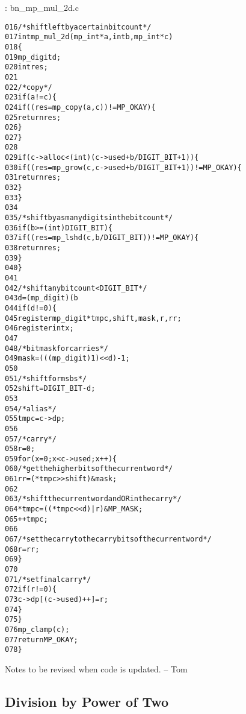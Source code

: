 \documentclass[b5paper]{book}
\begin{document}
\vspace{+3mm}\begin{small}
\hspace{-5.1mm}{\bf File}: bn\_mp\_mul\_2d.c
\vspace{-3mm}
\begin{alltt}
016   /* shift left by a certain bit count */
017   int mp_mul_2d (mp_int * a, int b, mp_int * c)
018   \{
019     mp_digit d;
020     int      res;
021   
022     /* copy */
023     if (a != c) \{
024        if ((res = mp_copy (a, c)) != MP_OKAY) \{
025          return res;
026        \}
027     \}
028   
029     if (c->alloc < (int)(c->used + b/DIGIT_BIT + 1)) \{
030        if ((res = mp_grow (c, c->used + b / DIGIT_BIT + 1)) != MP_OKAY) \{
031          return res;
032        \}
033     \}
034   
035     /* shift by as many digits in the bit count */
036     if (b >= (int)DIGIT_BIT) \{
037       if ((res = mp_lshd (c, b / DIGIT_BIT)) != MP_OKAY) \{
038         return res;
039       \}
040     \}
041   
042     /* shift any bit count < DIGIT_BIT */
043     d = (mp_digit) (b % DIGIT_BIT);
044     if (d != 0) \{
045       register mp_digit *tmpc, shift, mask, r, rr;
046       register int x;
047   
048       /* bitmask for carries */
049       mask = (((mp_digit)1) << d) - 1;
050   
051       /* shift for msbs */
052       shift = DIGIT_BIT - d;
053   
054       /* alias */
055       tmpc = c->dp;
056   
057       /* carry */
058       r    = 0;
059       for (x = 0; x < c->used; x++) \{
060         /* get the higher bits of the current word */
061         rr = (*tmpc >> shift) & mask;
062   
063         /* shift the current word and OR in the carry */
064         *tmpc = ((*tmpc << d) | r) & MP_MASK;
065         ++tmpc;
066   
067         /* set the carry to the carry bits of the current word */
068         r = rr;
069       \}
070       
071       /* set final carry */
072       if (r != 0) \{
073          c->dp[(c->used)++] = r;
074       \}
075     \}
076     mp_clamp (c);
077     return MP_OKAY;
078   \}
\end{alltt}
\end{small}

Notes to be revised when code is updated. -- Tom

\subsection{Division by Power of Two}
\end{document}
